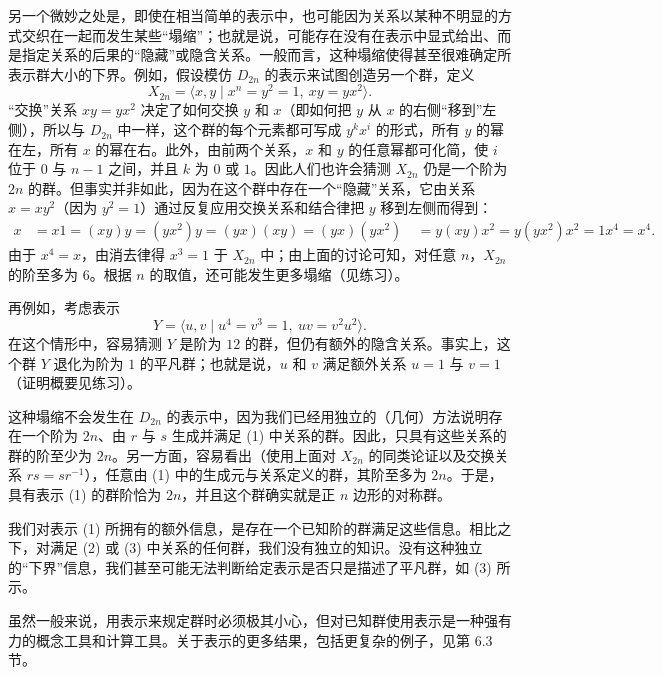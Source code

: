 另一个微妙之处是，即使在相当简单的表示中，也可能因为关系以某种不明显的方式交织在一起而发生某些“塌缩”；也就是说，可能存在没有在表示中显式给出、而是指定关系的后果的“隐藏”或隐含关系。一般而言，这种塌缩使得甚至很难确定所表示群大小的下界。例如，假设模仿 $D_{2n}$ 的表示来试图创造另一个群，定义
\begin{equation}
  X_{2n}=\langle x,y\mid x^n=y^2=1,\ xy=yx^2\rangle. \tag{1.2}
\end{equation}
“交换”关系 $xy=yx^2$ 决定了如何交换 $y$ 和 $x$（即如何把 $y$ 从 $x$ 的右侧“移到”左侧），所以与 $D_{2n}$ 中一样，这个群的每个元素都可写成 $y^kx^i$ 的形式，所有 $y$ 的幂在左，所有 $x$ 的幂在右。此外，由前两个关系，$x$ 和 $y$ 的任意幂都可化简，使 $i$ 位于 $0$ 与 $n-1$ 之间，并且 $k$ 为 $0$ 或 $1$。因此人们也许会猜测 $X_{2n}$ 仍是一个阶为 $2n$ 的群。但事实并非如此，因为在这个群中存在一个“隐藏”关系，它由关系 $x=xy^2$（因为 $y^2=1$）通过反复应用交换关系和结合律把 $y$ 移到左侧而得到：
\begin{align*}
  x&=x1=(xy)y=(yx^2)y=(yx)(xy)=(yx)(yx^2)\
   &=y(xy)x^2=y(yx^2)x^2=1x^4=x^4.
\end{align*}
由于 $x^4=x$，由消去律得 $x^3=1$ 于 $X_{2n}$ 中；由上面的讨论可知，对任意 $n$，$X_{2n}$ 的阶至多为 $6$。根据 $n$ 的取值，还可能发生更多塌缩（见练习）。

再例如，考虑表示
\begin{equation}
  Y=\langle u,v\mid u^4=v^3=1,\ uv=v^2u^2\rangle. \tag{1.3}
\end{equation}
在这个情形中，容易猜测 $Y$ 是阶为 $12$ 的群，但仍有额外的隐含关系。事实上，这个群 $Y$ 退化为阶为 $1$ 的平凡群；也就是说，$u$ 和 $v$ 满足额外关系 $u=1$ 与 $v=1$（证明概要见练习）。

这种塌缩不会发生在 $D_{2n}$ 的表示中，因为我们已经用独立的（几何）方法说明存在一个阶为 $2n$、由 $r$ 与 $s$ 生成并满足 (1) 中关系的群。因此，只具有这些关系的群的阶至少为 $2n$。另一方面，容易看出（使用上面对 $X_{2n}$ 的同类论证以及交换关系 $rs=sr^{-1}$），任意由 (1) 中的生成元与关系定义的群，其阶至多为 $2n$。于是，具有表示 (1) 的群阶恰为 $2n$，并且这个群确实就是正 $n$ 边形的对称群。

我们对表示 (1) 所拥有的额外信息，是存在一个已知阶的群满足这些信息。相比之下，对满足 (2) 或 (3) 中关系的任何群，我们没有独立的知识。没有这种独立的“下界”信息，我们甚至可能无法判断给定表示是否只是描述了平凡群，如 (3) 所示。

虽然一般来说，用表示来规定群时必须极其小心，但对已知群使用表示是一种强有力的概念工具和计算工具。关于表示的更多结果，包括更复杂的例子，见第 6.3 节。

